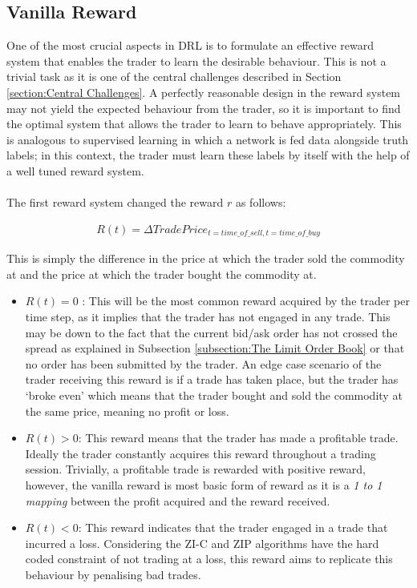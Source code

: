 \documentclass[ %
                    author={Ashwinder Khurana},
                supervisor={Prof Dave Cliff},
                    degree={MEng},
                     title={The Deeply Reinforced Trader},
                  subtitle={},
                      type={enterprise},
                      year={2020} ]{dissertation}
\begin{document}
{\subsection{Vanilla Reward}
\label{subsection:Vanilla Reward}
One of the most crucial aspects in DRL is to formulate an effective reward system that enables the trader to learn the desirable behaviour. This is not a trivial task as it is one of the central challenges described in Section \ref{section:Central Challenges}. A perfectly reasonable design in the reward system may not yield the expected behaviour from the trader, so it is important to find the optimal system that allows the trader to learn to behave appropriately. This is analogous to supervised learning in which a network is fed data alongside truth labels; in this context, the trader must learn these labels by itself with the help of a well tuned reward system. 
\\
\\
\noindent
The first reward system changed the reward $r$ as follows: 

\begin{equation}
\label{Vanilla Reward}
\begin{split}
R(t) = \Delta TradePrice_{t=time\_of\_ sell, t=time\_of\_buy}
\end{split}
\end{equation}

\noindent
This is simply the difference in the price at which the trader sold the commodity at and the price at which the trader bought the commodity at. 

\begin{itemize}
\item $R(t) = 0$ : This will be the most common reward acquired by the trader per time step, as it implies that the trader has not engaged in any trade. This may be down to the fact that the current bid/ask order has not crossed the spread as explained in Subsection \ref{subsection:The Limit Order Book} or that no order has been submitted by the trader. An edge case scenario of the trader receiving this reward is if a trade has taken place, but the trader has \enquote*{broke even} which means that the trader bought and sold the commodity at the same price, meaning no profit or loss.
\item $R(t) > 0$: This reward means that the trader has made a profitable trade. Ideally the trader constantly acquires this reward throughout a trading session. Trivially, a profitable trade is rewarded with positive reward, however, the vanilla reward is most basic form of reward as it is a \textit{1 to 1 mapping} between the profit acquired and the reward received. 
\item $R(t) < 0$: This reward indicates that the trader engaged in a trade that incurred a loss. Considering the ZI-C and ZIP algorithms have the hard coded constraint of not trading at a loss, this reward aims to replicate this behaviour by penalising bad trades.
\end{itemize}

}
\end{document}
